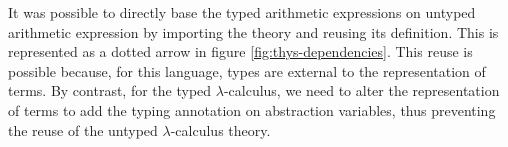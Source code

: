 It was possible to directly base the typed arithmetic expressions on untyped arithmetic expression
by importing the theory and reusing its definition. This is represented as a dotted arrow in figure
\ref{fig:thys-dependencies}. This reuse is possible because, for this language, types are external
to the representation of terms. By contrast, for the typed $\lambda$-calculus, we need to alter the
representation of terms to add the typing annotation on abstraction variables, thus preventing the
reuse of the untyped $\lambda$-calculus theory.
